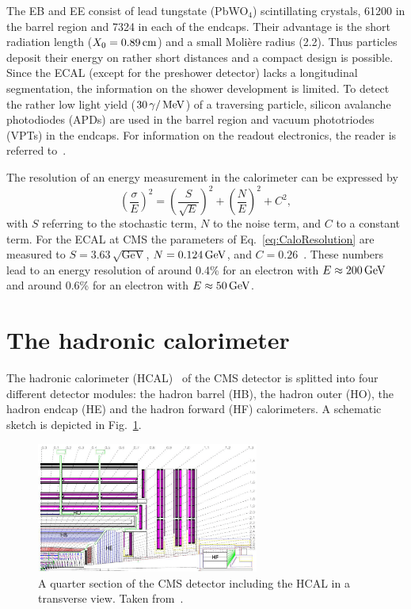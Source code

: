 The EB and EE consist of lead tungstate (PbWO$_4$) scintillating crystals, 61200 in the barrel region and 7324 in each of the endcaps. 
Their advantage is the short radiation length ($X_0=0.89\,\text{cm}$) and a small Moli\`ere radius (2.2\cm).
Thus particles deposit their energy on rather short distances and a compact design is possible.
Since the ECAL (except for the preshower detector) lacks a longitudinal segmentation, the information on the shower development is limited.
To detect the rather low light yield ($30\,\gamma/\,\text{Me}\kern-0.06667em\text{V}$) of a traversing particle, silicon avalanche photodiodes (APDs) are used in the barrel region and vacuum  phototriodes (VPTs) in the endcaps.
For information on the readout electronics, the reader is referred to~\cite{bib:CMS:TDR_2006}.

The resolution of an energy measurement in the calorimeter can be expressed by 
\begin{equation}
\label{eq:CaloResolution}
\left( \frac{\sigma}{E} \right)^2 = \left( \frac{S}{\sqrt{E}} \right)^2 + \left( \frac{N}{E} \right)^2 +C^2,
\end{equation}
with $S$ referring to the stochastic term, $N$ to the noise term, and $C$ to a constant term.
For the ECAL at CMS the parameters of Eq.~\eqref{eq:CaloResolution} are measured to $S=3.63\,\sqrt{\text{GeV}}$, $N=0.124\,\text{Ge}\kern-0.06667em\text{V}$, and $C=0.26$~\cite{bib:CMS:TDR_2006}. 
These numbers lead to an energy resolution of around 0.4\% for an electron with $E \approx 200\,\text{Ge}\kern-0.06667em\text{V}$ and around 0.6\% for an electron with $E \approx 50\,\text{Ge}\kern-0.06667em\text{V}$.

\section{The hadronic calorimeter}
The hadronic calorimeter (HCAL)~\cite{bib:CMS:TDR_2006,bib:CMS:TDR_HCAL} of the CMS detector is splitted into four different detector modules: the hadron barrel (HB), the hadron outer (HO), the hadron endcap (HE) and the hadron forward (HF) calorimeters.
A schematic sketch is depicted in Fig.~\ref{fig:HCAL}.
\begin{figure}[!b]
  \centering
      \includegraphics[width=0.65\textwidth]{figures/experiment/CMS/fig_HCALdiagram_smaller_size.png}
  \caption{A quarter section of the CMS detector including the HCAL in a transverse view. Taken from~\cite{bib:CMS:experiment}.}  
  \label{fig:HCAL}
\end{figure}

